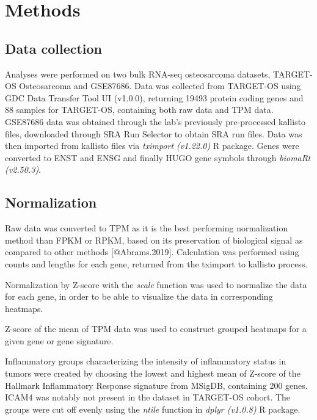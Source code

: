 \documentclass[
]{article}
\author{}
\date{\vspace{-2.5em}}
\begin{document}
\hypertarget{methods}{%
\section{Methods}\label{methods}}

\hypertarget{data-collection}{%
\subsection{Data collection}\label{data-collection}}

Analyses were performed on two bulk RNA-seq osteosarcoma datasets,
TARGET-OS Osteosarcoma and GSE87686. Data was collected from TARGET-OS
using GDC Data Transfer Tool UI (v1.0.0), returning 19493 protein coding
genes and 88 samples for TARGET-OS, containing both raw data and TPM
data. GSE87686 data was obtained through the lab's previously
pre-processed kallisto files, downloaded through SRA Run Selector to
obtain SRA run files. Data was then imported from kallisto files via
\emph{tximport (v1.22.0)} R package. Genes were converted to ENST and
ENSG and finally HUGO gene symbols through \emph{biomaRt (v2.50.3)}.

\hypertarget{normalization}{%
\subsection{Normalization}\label{normalization}}

Raw data was converted to TPM as it is the best performing normalization
method than FPKM or RPKM, based on its preservation of biological signal
as compared to other methods {[}@Abrams.2019{]}. Calculation was
performed using counts and lengths for each gene, returned from the
tximport to kallisto process.

Normalization by Z-score with the \emph{scale} function was used to
normalize the data for each gene, in order to be able to visualize the
data in corresponding heatmaps.

Z-score of the mean of TPM data was used to construct grouped heatmaps
for a given gene or gene signature.

Inflammatory groups characterizing the intensity of inflammatory status
in tumors were created by choosing the lowest and highest mean of
Z-score of the Hallmark Inflammatory Response signature from MSigDB,
containing 200 genes. ICAM4 was notably not present in the dataset in
TARGET-OS cohort. The groups were cut off evenly using the \emph{ntile}
function in \emph{dplyr (v1.0.8)} R package.
\end{document}

